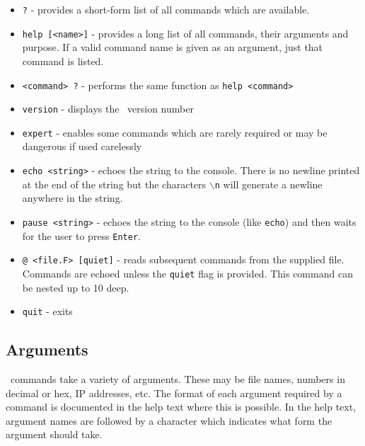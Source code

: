 \begin{itemize}

\item
\texttt{?} - provides a short-form list of all commands which are available.

\item
\texttt{help [<name>]} - provides a long list of all commands, their
arguments and purpose. If a valid command name is given as an argument,
just that command is listed.

\item
\texttt{<command> ?} - performs the same function as \texttt{help <command>}

\item
\texttt{version} - displays the \ybug\ version number

\item
\texttt{expert} - enables some commands which are rarely required or
may be dangerous if used carelessly

\item
\texttt{echo <string>} - echoes the string to the console. There
is no newline printed at the end of the string but the characters
\texttt{$\backslash$n} will generate a newline anywhere in the string.

\item
\texttt{pause <string>} - echoes the string to the console (like
\texttt{echo}) and then waits for the user to press \texttt{Enter}.

\item
\texttt{@ <file.F> [quiet]} - reads subsequent commands from the
supplied file. Commands are echoed unless the \texttt{quiet} flag is
provided. This command can be nested up to 10 deep.

\item
\texttt{quit} - exits \ybug\

\end{itemize}

\subsection{Arguments}

\ybug\ commands take a variety of arguments. These may be file names,
numbers in decimal or hex, IP addresses, etc. The format of each
argument required by a command is documented in the help text where
this is possible. In the help text, argument names are followed by a
character which indicates what form the argument should take.

